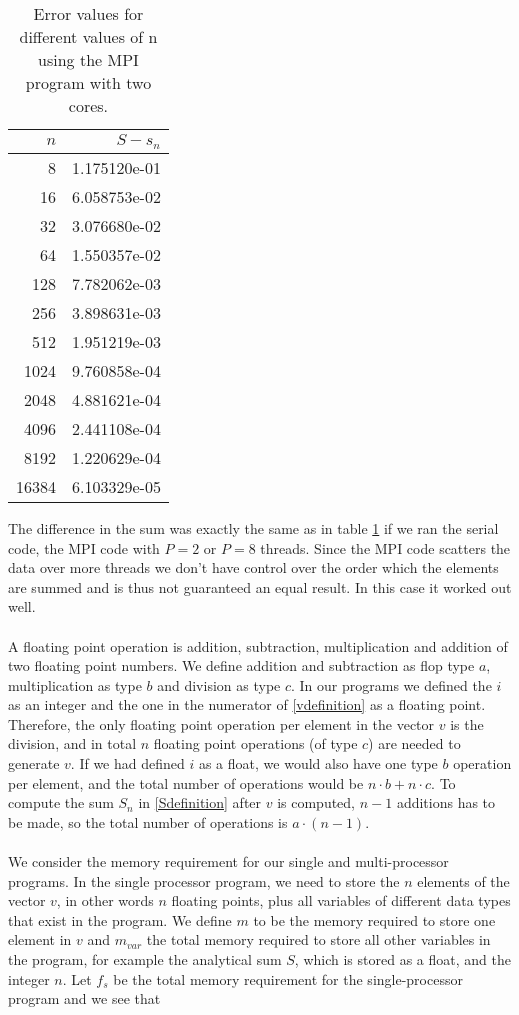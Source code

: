 \documentclass{article}
\begin{document}
\begin{table}
\centering
\caption{Error values for different values of n using the MPI program with two cores.}
\label{tab:MPIerror}
\begin{tabular}{rr}
$n$ & $S-s_n$  \\ 
\hline 
8     & 1.175120e-01 \\ 
16    & 6.058753e-02 \\ 
32    & 3.076680e-02 \\ 
64    & 1.550357e-02 \\ 
128   & 7.782062e-03 \\ 
256   & 3.898631e-03 \\ 
512   & 1.951219e-03 \\ 
1024  & 9.760858e-04 \\ 
2048  & 4.881621e-04 \\ 
4096  & 2.441108e-04 \\ 
8192  & 1.220629e-04 \\ 
16384 & 6.103329e-05
\end{tabular}
\end{table} 
The difference in the sum was exactly the same as in table \ref{tab:MPIerror} if we ran the serial code, the MPI code with $P =2$ or $P = 8$ threads. Since the MPI code scatters the data over more threads we don't have control over the order which the elements are summed and is thus not guaranteed an equal result. In this case it worked out well.
\\
\\
A floating point operation is addition, subtraction, multiplication and addition of two floating point numbers. We define addition and subtraction as flop type $a$, multiplication as type $b$ and division as type $c$. In our programs we defined the $i$ as an integer and the one in the numerator of \eqref{vdefinition} as a floating point. Therefore, the only floating point operation per element in the vector $v$ is the division, and in total $n$ floating point operations (of type $c$) are needed to generate $v$. If we had defined $i$ as a float, we would also have one type $b$ operation per element, and the total number of operations would be $n\cdot b + n\cdot c$. To compute the sum $S_n$ in \eqref{Sdefinition} after $v$ is computed, $n-1$ additions has to be made, so the total number of operations is $a\cdot (n-1)$. 
\\
\\
We consider the memory requirement for our single and multi-processor programs. In the single processor program, we need to store the $n$ elements of the vector $v$, in other words $n$ floating points, plus all variables of different data types that exist in the program. We define $m$ to be the memory required to store one element in $v$ and $m_{var}$ the total memory required to store all other variables in the program, for example the analytical sum $S$, which is stored as a float, and the integer $n$. Let $f_s$ be the total memory requirement for the single-processor program and we see that
\end{document}

